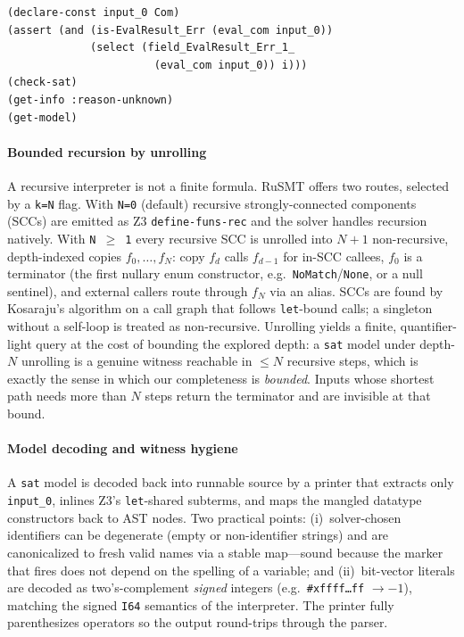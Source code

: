 \documentclass[sigplan,review,anonymous]{acmart}
\theoremstyle{definition}
\theoremstyle{remark}
\newcommand{\rusmt}{RuSMT}
\newcommand{\imp}{IMP}
\newcommand{\code}[1]{\texttt{#1}}
\begin{document}
\begin{lstlisting}[style=smt,caption={The synthesis query for one \imp{} marker
(text backend): find an \code{input\_0\,:\,Com} whose evaluation is
\code{EvalResult::Err} carrying marker $i$.},label={lst:query}]
(declare-const input_0 Com)
(assert (and (is-EvalResult_Err (eval_com input_0))
             (select (field_EvalResult_Err_1_
                       (eval_com input_0)) i)))
(check-sat)
(get-info :reason-unknown)
(get-model)
\end{lstlisting}

\paragraph{Bounded recursion by unrolling}
A recursive interpreter is not a finite formula. \rusmt{} offers two routes,
selected by a \code{k=N} flag. With \code{N=0} (default) recursive
strongly-connected components (SCCs) are emitted as Z3 \code{define-funs-rec} and
the solver handles recursion natively. With \code{N\,$\geq$\,1} every recursive
SCC is unrolled into $N{+}1$ non-recursive, depth-indexed copies $f_0,\dots,f_N$:
copy $f_d$ calls $f_{d-1}$ for in-SCC callees, $f_0$ is a terminator (the first
nullary enum constructor, e.g.\ \code{NoMatch}/\code{None}, or a null sentinel),
and external callers route through $f_N$ via an alias. SCCs are found by
Kosaraju's algorithm on a call graph that follows \code{let}-bound calls; a
singleton without a self-loop is treated as non-recursive. Unrolling yields a
finite, quantifier-light query at the cost of bounding the explored depth: a
\code{sat} model under depth-$N$ unrolling is a genuine witness reachable in
$\leq N$ recursive steps, which is exactly the sense in which our completeness is
\emph{bounded}. Inputs whose shortest path needs more than $N$ steps return the
terminator and are invisible at that bound.

\paragraph{Model decoding and witness hygiene}
A \code{sat} model is decoded back into runnable source by a printer that extracts
only \code{input\_0}, inlines Z3's \code{let}-shared subterms, and maps the
mangled datatype constructors back to AST nodes. Two practical points:
(i)~solver-chosen identifiers can be degenerate (empty or non-identifier strings)
and are canonicalized to fresh valid names via a stable map---sound because the
marker that fires does not depend on the spelling of a variable; and
(ii)~bit-vector literals are decoded as two's-complement \emph{signed} integers
(e.g.\ \code{\#xffff\dots ff} $\to -1$), matching the signed \code{I64} semantics
of the interpreter. The printer fully parenthesizes operators so the output
round-trips through the parser.
\end{document}
